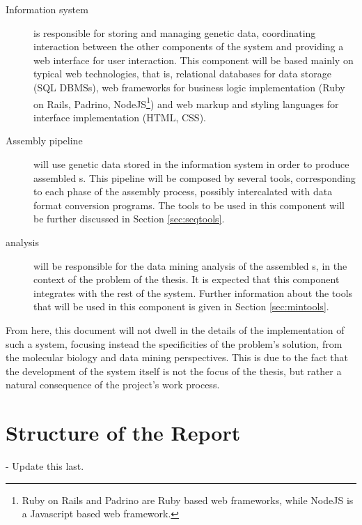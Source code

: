 \begin{description}

  \item[Information system]
  is responsible for storing and managing genetic data, coordinating interaction
  between the other components of the system and providing a web interface for
  user interaction. This component will be based mainly on typical web
  technologies, that is, relational databases for data storage (SQL DBMSs), web
  frameworks for business logic implementation (Ruby on Rails, Padrino,
  NodeJS\footnote{Ruby on Rails and Padrino are Ruby based web frameworks, while
  NodeJS is a Javascript based web framework.}) and web markup and styling
  languages for interface implementation (HTML, CSS).

  \item[Assembly pipeline]
  will use genetic data stored in the information system in order to produce
  assembled \trans s. This pipeline will be composed by several tools,
  corresponding to each phase of the assembly process, possibly intercalated
  with data format conversion programs. The tools to be used in this component
  will be further discussed in Section \ref{sec:seqtools}.

  \item[\Trans{} analysis]
  will be responsible for the data mining analysis of the assembled \trans s, in
  the context of the problem of the thesis. It is expected that this component
  integrates with the rest of the system. Further information about the tools
  that will be used in this component is given in Section \ref{sec:mintools}.

\end{description}

From here, this document will not dwell in the details of the implementation of
such a system, focusing instead the specificities of the problem's solution,
from the molecular biology and data mining perspectives. This is due to the fact
that the development of the system itself is not the focus of the thesis, but
rather a natural consequence of the project's work process.

\section{Structure of the Report} \label{sec:outline}

\begin{Notes}
- Update this last.\\
\end{Notes}

